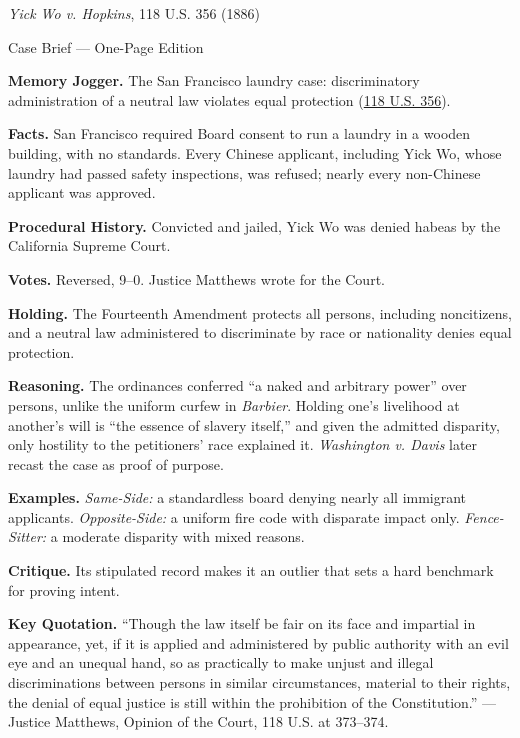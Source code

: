 \documentclass[12pt]{article}
\begin{document}
\begin{center}
{\Large \textit{Yick Wo v. Hopkins}, 118 U.S. 356 (1886)\par}
\vspace{0.3em}
{\normalsize Case Brief --- One-Page Edition\par}
\end{center}

\textbf{Memory Jogger.} The San Francisco laundry case: discriminatory administration of a neutral law violates equal protection (\href{https://supreme.justia.com/cases/federal/us/118/356/}{118 U.S. 356}).

\textbf{Facts.} San Francisco required Board consent to run a laundry in a wooden building, with no standards. Every Chinese applicant, including Yick Wo, whose laundry had passed safety inspections, was refused; nearly every non-Chinese applicant was approved.

\textbf{Procedural History.} Convicted and jailed, Yick Wo was denied habeas by the California Supreme Court.

\textbf{Votes.} Reversed, 9--0. Justice Matthews wrote for the Court.

\textbf{Holding.} The Fourteenth Amendment protects all persons, including noncitizens, and a neutral law administered to discriminate by race or nationality denies equal protection.

\textbf{Reasoning.} The ordinances conferred ``a naked and arbitrary power'' over persons, unlike the uniform curfew in \textit{Barbier}. Holding one's livelihood at another's will is ``the essence of slavery itself,'' and given the admitted disparity, only hostility to the petitioners' race explained it. \textit{Washington v. Davis} later recast the case as proof of purpose.

\textbf{Examples.} \emph{Same-Side:} a standardless board denying nearly all immigrant applicants. \emph{Opposite-Side:} a uniform fire code with disparate impact only. \emph{Fence-Sitter:} a moderate disparity with mixed reasons.

\textbf{Critique.} Its stipulated record makes it an outlier that sets a hard benchmark for proving intent.

\textbf{Key Quotation.} ``Though the law itself be fair on its face and impartial in appearance, yet, if it is applied and administered by public authority with an evil eye and an unequal hand, so as practically to make unjust and illegal discriminations between persons in similar circumstances, material to their rights, the denial of equal justice is still within the prohibition of the Constitution.'' --- Justice Matthews, Opinion of the Court, 118 U.S. at 373--374.
\end{document}
